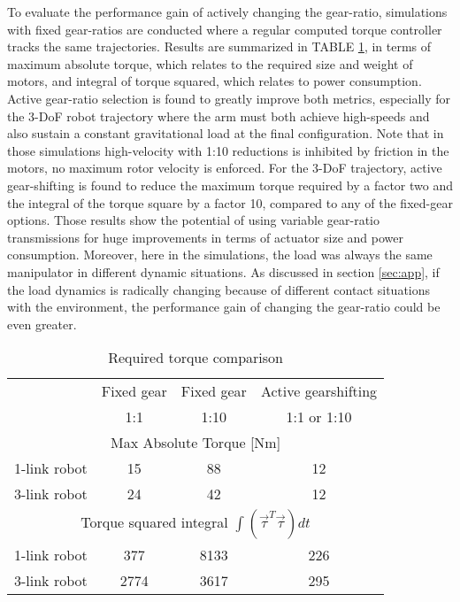 To evaluate the performance gain of actively changing the gear-ratio, simulations with fixed gear-ratios are conducted where a regular computed torque controller tracks the same trajectories. Results are summarized in TABLE \ref{tab:MaximumTorqueComparison}, in terms of maximum absolute torque, which relates to the required size and weight of motors, and integral of torque squared, which relates to power consumption. Active gear-ratio selection is found to greatly improve both metrics, especially for the 3-DoF robot trajectory where the arm must both achieve high-speeds and also sustain a constant gravitational load at the final configuration. Note that in those simulations high-velocity with 1:10 reductions is inhibited by friction in the motors, no maximum rotor velocity is enforced. For the 3-DoF trajectory, active gear-shifting is found to reduce the maximum torque required by a factor two and the integral of the torque square by a factor 10, compared to any of the fixed-gear options. Those results show the potential of using variable gear-ratio transmissions for huge improvements in terms of actuator size and power consumption. Moreover, here in the simulations, the load was always the same manipulator in different dynamic situations. As discussed in section \ref{sec:app}, if the load dynamics is radically changing because of different contact situations with the environment, the performance gain of changing the gear-ratio could be even greater. 
%
\begin{table}[htp]
	\centering
		\caption{Required torque comparison}
		\begin{tabular}{ c c c c }
		\hline
		     & Fixed gear & Fixed gear & Active gearshifting \\
			& 1:1 &  1:10 &  1:1 or 1:10 \\
		\hline \hline
		\multicolumn{4}{c}{ Max Absolute Torque [Nm] } \\
		\hline \hline
		1-link robot  & 15 & 88 & 12 \\	
		3-link robot  & 24 & 42 & 12 \\	
		\hline \hline
		\multicolumn{4}{c}{ Torque squared integral $\int{ ( \vec{\tau}^T \vec{\tau} ) dt }$ } \\
		\hline \hline
		1-link robot  & 377  & 8133 & 226  \\	
		3-link robot  & 2774 & 3617 & 295  \\	
		\hline \hline
		\end{tabular}
	\label{tab:MaximumTorqueComparison}
\end{table}
%



